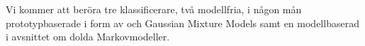 \documentclass[../rapport_MVEX01-11-05]{subfiles}
\begin{document}
Vi kommer att beröra tre klassificerare, två modellfria, i någon mån
prototypbaserade i form av \knn och Gaussian Mixture Models samt en
modellbaserad i avsnittet om dolda Markovmodeller.

%
\end{document}
